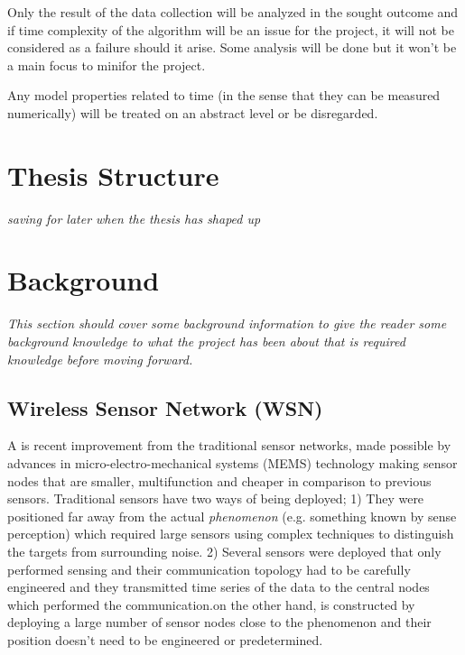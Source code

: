 Only the result of the data collection will be analyzed in the sought outcome and if time complexity of the algorithm will be an issue for the project, it will not be considered as a failure should it arise. Some analysis will be done but it won't be a main focus to minifor the project.

Any model properties related to time (in the sense that they can be measured numerically) will be treated on an abstract level or be disregarded. %




\section{Thesis Structure}

\textit{saving for later when the thesis has shaped up}

\section{Background}

\textit{This section should cover some background information to give the reader some background knowledge to what the project has been about that is required knowledge before moving forward.}

\subsection{Wireless Sensor Network (WSN)}



A \wsn is recent improvement from the traditional sensor networks, made possible by advances in micro-electro-mechanical systems (MEMS) technology making sensor nodes that are smaller, multifunction and cheaper in comparison to previous sensors. Traditional sensors have two ways of being deployed; 1) They were positioned far away from the actual \textit{phenomenon} (e.g. something known by sense perception) which required large sensors using complex techniques to distinguish the targets from surrounding noise. 2) Several sensors were deployed that only performed sensing and their communication topology had to be carefully engineered and they transmitted time series of the data to the central nodes which performed the communication.\wsns on the other hand, is constructed by deploying a large number of sensor nodes close to the phenomenon and their position doesn't need to be engineered or predetermined.\cite{WSN_a_survey} 

